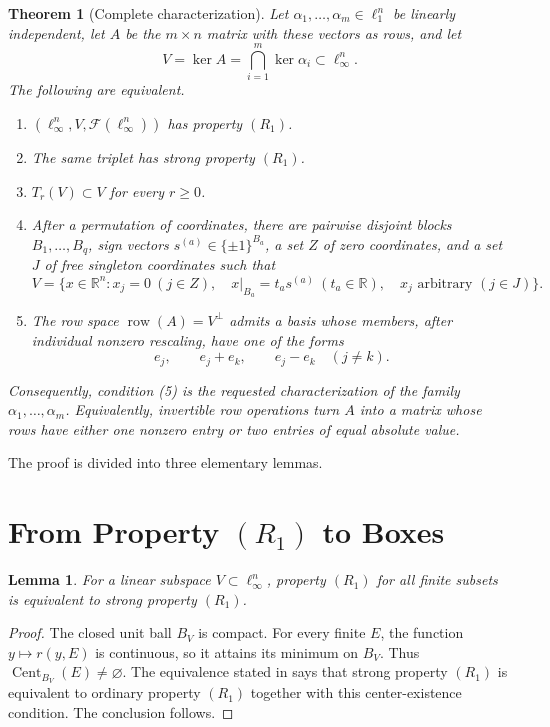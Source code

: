 \documentclass[11pt]{article}
\newtheorem{theorem}{Theorem}
\newtheorem{lemma}{Lemma}
\theoremstyle{definition}
\newcommand{\R}{\mathbb R}
\newcommand{\Ffin}{\mathcal F}
\newcommand{\row}{\operatorname{row}}
\begin{document}
\begin{theorem}[Complete characterization]\label{thm:main}
Let \(\alpha_1,\ldots,\alpha_m\in\ell_1^n\) be linearly independent, let
\(A\) be the \(m\times n\) matrix with these vectors as rows, and let
\[
 V=\ker A=\bigcap_{i=1}^m\ker\alpha_i\subset\ell_\infty^n.
\]
The following are equivalent.
\begin{enumerate}
\item \((\ell_\infty^n,V,\Ffin(\ell_\infty^n))\) has property \((R_1)\).
\item The same triplet has strong property \((R_1)\).
\item \(T_r(V)\subset V\) for every \(r\ge0\).
\item After a permutation of coordinates, there are pairwise disjoint blocks
      \(B_1,\ldots,B_q\), sign vectors
      \(s^{(a)}\in\{\pm1\}^{B_a}\), a set \(Z\) of zero coordinates, and
      a set \(J\) of free singleton coordinates such that
      \[
      V=\{x\in\R^n:x_j=0\ (j\in Z),\quad
      x|_{B_a}=t_a s^{(a)}\ (t_a\in\R),\quad
      x_j\text{ arbitrary }(j\in J)\}.
      \]
\item The row space \(\row(A)=V^\perp\) admits a basis whose members, after
      individual nonzero rescaling, have one of the forms
      \[
      e_j,\qquad e_j+e_k,\qquad e_j-e_k\quad(j\ne k).
      \]
\end{enumerate}
Consequently, condition (5) is the requested characterization of the family
\(\alpha_1,\ldots,\alpha_m\).  Equivalently, invertible row operations turn
\(A\) into a matrix whose rows have either one nonzero entry or two entries of
equal absolute value.
\end{theorem}

The proof is divided into three elementary lemmas.

\section{From Property \texorpdfstring{\((R_1)\)}{(R1)} to Boxes}

\begin{lemma}\label{lem:strong}
For a linear subspace \(V\subset\ell_\infty^n\), property \((R_1)\) for all
finite subsets is equivalent to strong property \((R_1)\).
\end{lemma}

\begin{proof}
The closed unit ball \(B_V\) is compact.  For every finite \(E\), the function
\(y\mapsto r(y,E)\) is continuous, so it attains its minimum on \(B_V\).
Thus \(\operatorname{Cent}_{B_V}(E)\ne\varnothing\).  The equivalence stated
in \cite[Theorem 1.4]{DasPaul} says that strong property \((R_1)\) is
equivalent to ordinary property \((R_1)\) together with this center-existence
condition.  The conclusion follows.
\end{proof}
\end{document}

